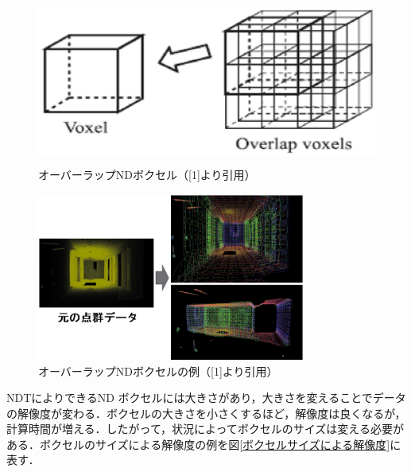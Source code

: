 %
\begin{figure}[htbp]
  \vspace{-3mm}
  \begin{center}
   \includegraphics[height=55mm]{figure/オーバーラップNDボクセル.eps}
   \vspace{-5mm}
   \caption{オーバーラップNDボクセル（[1]より引用）}
   \label{オーバーラップNDボクセル}
  \end{center}
\end{figure}
%
%
\begin{figure}[htbp]
  \vspace{-3mm}
  \begin{center}
   \includegraphics[height=55mm]{figure/オーバーラップNDボクセルの例.eps}
   \vspace{-5mm}
   \caption{オーバーラップNDボクセルの例（[1]より引用）}
   \label{オーバーラップNDボクセルの例}
  \end{center}
\end{figure}
%
\newpage
%
NDTによりできるND ボクセルには大きさがあり，大きさを変えることでデータの解像度が変わる．ボクセルの大きさを小さくするほど，解像度は良くなるが，計算時間が増える．したがって，状況によってボクセルのサイズは変える必要がある．ボクセルのサイズによる解像度の例を図{\ref{ボクセルサイズによる解像度}}に表す．

